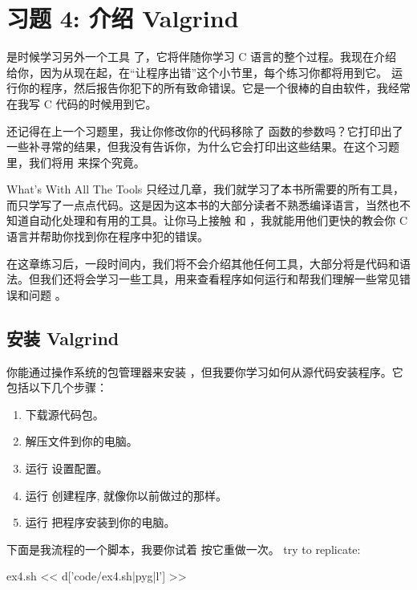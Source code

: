 \chapter{习题 4: 介绍 Valgrind}

是时候学习另外一个工具  了，它将伴随你学习 C 语言的整个过程。我现在介绍  给你，因为从现在起，在“让程序出错”这个小节里，每个练习你都将用到它。 运行你的程序，然后报告你犯下的所有致命错误。它是一个很棒的自由软件，我经常在我写 C 代码的时候用到它。

还记得在上一个习题里，我让你修改你的代码移除了  函数的参数吗？它打印出了一些补寻常的结果，但我没有告诉你，为什么它会打印出这些结果。在这个习题里，我们将用  来探个究竟。

\begin{aside}{What's With All The Tools}
只经过几章，我们就学习了本书所需要的所有工具，而只学写了一点点代码。这是因为这本书的大部分读者不熟悉编译语言，当然也不知道自动化处理和有用的工具。让你马上接触   和  ，我就能用他们更快的教会你 C 语言并帮助你找到你在程序中犯的错误。

在这章练习后，一段时间内，我们将不会介绍其他任何工具，大部分将是代码和语法。但我们还将会学习一些工具，用来查看程序如何运行和帮我们理解一些常见错误和问题 。

\end{aside}

\section{安装 Valgrind}

 你能通过操作系统的包管理器来安装 ，但我要你学习如何从源代码安装程序。它包括以下几个步骤：

\begin{enumerate}
\item 下载源代码包。
\item 解压文件到你的电脑。
\item 运行  设置配置。
\item 运行  创建程序, 就像你以前做过的那样。
\item 运行  把程序安装到你的电脑。
\end{enumerate}

下面是我流程的一个脚本，我要你试着 按它重做一次。
try to replicate:

\begin{code}{ex4.sh}
<< d['code/ex4.sh|pyg|l'] >>
\end{code}

